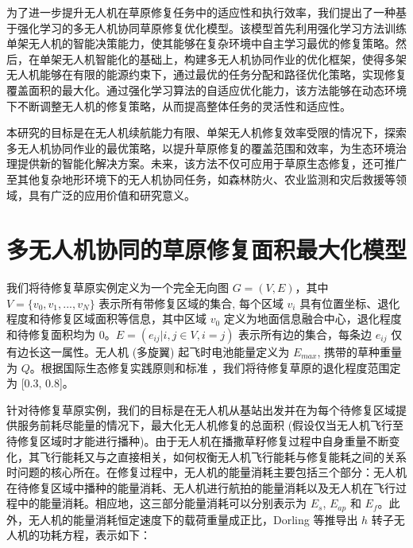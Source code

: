 \documentclass[AutoFakeBold]{LZUThesis}
\begin{document}
为了进一步提升无人机在草原修复任务中的适应性和执行效率，我们提出了一种基于强化学习的多无人机协同草原修复优化模型。该模型首先利用强化学习方法训练单架无人机的智能决策能力，使其能够在复杂环境中自主学习最优的修复策略。然后，在单架无人机智能化的基础上，构建多无人机协同作业的优化框架，使得多架无人机能够在有限的能源约束下，通过最优的任务分配和路径优化策略，实现修复覆盖面积的最大化。通过强化学习算法的自适应优化能力，该方法能够在动态环境下不断调整无人机的修复策略，从而提高整体任务的灵活性和适应性。

本研究的目标是在无人机续航能力有限、单架无人机修复效率受限的情况下，探索多无人机协同作业的最优策略，以提升草原修复的覆盖范围和效率，为生态环境治理提供新的智能化解决方案。未来，该方法不仅可应用于草原生态修复，还可推广至其他复杂地形环境下的无人机协同任务，如森林防火、农业监测和灾后救援等领域，具有广泛的应用价值和研究意义。




\mainmatter

\chapter{多无人机协同的草原修复面积最大化模型}

我们将待修复草原实例定义为一个完全无向图 $G = (V, E)$，其中 $V = \{v_0, v_1, ..., v_N \}$ 表示所有带修复区域的集合, 每个区域 $v_i$ 具有位置坐标、退化程度和待修复区域面积等信息，其中区域 $v_0$ 定义为地面信息融合中心，退化程度和待修复面积均为 0。$E = (e_{ij} |i, j \in V, i = j)$ 表示所有边的集合，每条边 $e_{ij}$ 仅有边长这一属性。无人机 (多旋翼) 起飞时电池能量定义为 $E_{max}$, 携带的草种重量为 $Q$。根据国际生态修复实践原则和标准\cite{gann2019international} ，我们将待修复草原的退化程度范围定为 [0.3, 0.8]。

针对待修复草原实例，我们的目标是在无人机从基站出发并在为每个待修复区域提供服务前耗尽能量的情况下，最大化无人机修复的总面积 (假设仅当无人机飞行至待修复区域时才能进行播种)。由于无人机在播撒草籽修复过程中自身重量不断变化，其飞行能耗又与之直接相关，如何权衡无人机飞行能耗与修复能耗之间的关系时问题的核心所在。在修复过程中，无人机的能量消耗主要包括三个部分：无人机在待修复区域中播种的能量消耗、无人机进行航拍的能量消耗以及无人机在飞行过程中的能量消耗。相应地，这三部分能量消耗可以分别表示为 $E_s$, $E_{ap}$ 和 $E_f$。此外，无人机的能量消耗恒定速度下的载荷重量成正比，Dorling\cite{dorling2016vehicle} 等推导出 $h$ 转子无人机的功耗方程，表示如下：
\end{document}
